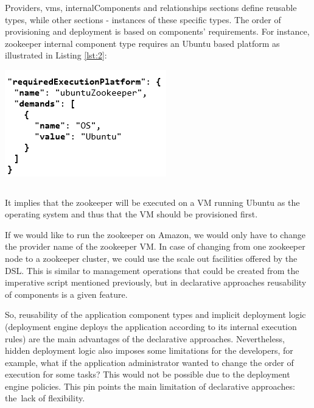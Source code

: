 \noindent

\noindent Providers, vms, internalComponents and relationships sections define reusable types, while other sections - instances of these specific types. The order of provisioning and deployment is based on components' requirements. For instance, zookeeper internal component type requires an Ubuntu based platform as illustrated in Listing \ref{lst:2}:

\begin{center}
	\includegraphics{./Figures/Zookeeper}
	\begin{lstlisting}[caption={Specification of the required platform for Zookeeper component},label={lst:2}]    
	\end{lstlisting}
\end{center}

\noindent It implies that the zookeeper will be executed on a VM running Ubuntu as the operating system and thus that the VM should be provisioned first.

\noindent 

\noindent If we would like to run the zookeeper on Amazon, we would only have to change the provider name of the zookeeper VM. In case of changing from one zookeeper node to a zookeeper cluster, we could use the scale out facilities offered by the DSL. This is similar to management operations that could be created from the imperative script mentioned previously, but in declarative approaches reusability of components is a given feature.

\noindent 

\noindent So, reusability of the application component types and implicit deployment logic (deployment engine deploys the application according to its internal execution rules) are the main advantages of the declarative approaches. Nevertheless, hidden deployment logic also imposes some limitations for the developers, for example, what if the application administrator wanted to change the order of execution for some tasks? This would not be possible due to the deployment engine policies. This pin points the main limitation of declarative approaches: the~lack of flexibility. 

